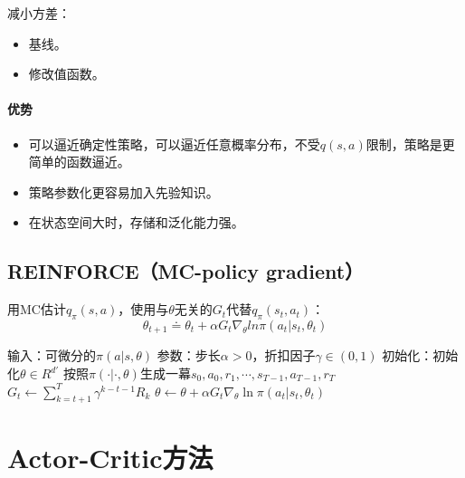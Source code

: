 \documentclass[
12pt, %
a4paper, 
oneside, %
headinclude,footinclude, %
]{scrartcl}
\begin{document}
减小方差：
\begin{itemize}
\item 基线。
\item 修改值函数。
\end{itemize}
\paragraph{优势}
\begin{itemize}
\item 可以逼近确定性策略，可以逼近任意概率分布，不受$ q(s, a) $限制，策略是更简单的函数逼近。
\item 策略参数化更容易加入先验知识。
\item 在状态空间大时，存储和泛化能力强。
\end{itemize}
\subsection[REINFORCE]{REINFORCE（MC-policy gradient）}
用MC估计$ q_\pi(s, a) $，使用与$ \theta $无关的$ G_t $代替$ q_\pi(s_t, a_t) $：
$$ \theta_{t + 1} \doteq \theta_t + \alpha G_t \nabla_{\theta} ln \pi (a_t|s_t, \theta_t) $$
\begin{myalgorithm}[REINFORCE]
\State 输入：可微分的$ \pi(a|s, \theta) $
\State 参数：步长$ \alpha > 0 $，折扣因子$ \gamma \in (0, 1) $
\State 初始化：初始化$ \theta \in R^{d'} $
\Loop
\State 按照$ \pi(\cdot|\cdot, \theta) $生成一幕$ s_0, a_0, r_1, \cdots, s_{T - 1}, a_{T - 1}, r_T $
\State $ G_t \gets \sum_{k = t + 1}^{T} \gamma^{k - t - 1}R_k $
\State $ \theta \gets \theta + \alpha G_t \nabla_{\theta} \ln \pi(a_t|s_t, \theta_t) $
\EndFor
\EndLoop
\end{myalgorithm}
\section{Actor-Critic方法}
\end{document}
